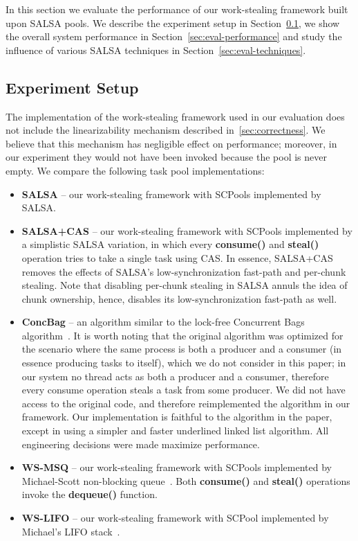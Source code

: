 In this section we evaluate the performance of our work-stealing framework built upon SALSA pools. 
We describe the experiment setup in Section~\ref{sec:exp-setup}, we show the overall system performance in Section~\ref{sec:eval-performance} and study the influence of various SALSA techniques in Section~\ref{sec:eval-techniques}.

\subsection {Experiment Setup}
\label{sec:exp-setup}
The implementation of the work-stealing framework used in our evaluation does not include the linearizability mechanism described in~\ref{sec:correctness}. We believe that this mechanism has negligible effect on performance; moreover, in our experiment they would not have been invoked because the pool is never empty. We compare the following task pool implementations:
\begin {itemize}
\item
{\bf SALSA} -- our work-stealing framework with SCPools implemented by SALSA.
\item
{\bf SALSA+CAS} -- our work-stealing framework with SCPools implemented by a simplistic SALSA variation, in which every {\bf consume()} and {\bf steal()} operation tries to take a single task using CAS. In essence, SALSA+CAS removes the effects of SALSA's low-synchronization fast-path and per-chunk stealing. 
Note that disabling per-chunk stealing in SALSA annuls the idea of chunk ownership, hence, disables its low-synchronization fast-path as well. 
\item
{\bf ConcBag} -- an algorithm similar to the lock-free Concurrent Bags algorithm~\cite{Sundell:2011:LAC:1989493.1989550}. 
It is worth noting that the original algorithm was optimized for the scenario where the same process is both a producer and a consumer (in essence producing tasks to itself), which we do not consider in this paper; in our system no thread acts as both a producer and a consumer, therefore every consume operation steals a task from some producer.
We did not have access to the original code, and therefore reimplemented the algorithm in our framework. Our implementation is faithful to the algorithm in the paper, except in using a simpler and faster underlined linked list algorithm. All engineering decisions were made maximize performance. 
\item
{\bf WS-MSQ} -- our work-stealing framework with SCPools implemented by Michael-Scott non-blocking queue~\cite{Michael:1996:SFP:248052.248106}. Both {\bf consume()} and {\bf steal()} operations invoke the {\bf dequeue()} function. 
\item
{\bf WS-LIFO} -- our work-stealing framework with SCPool implemented by Michael's LIFO stack~\cite{Michael:2004:HPS:987524.987595}. 
\end {itemize} 


